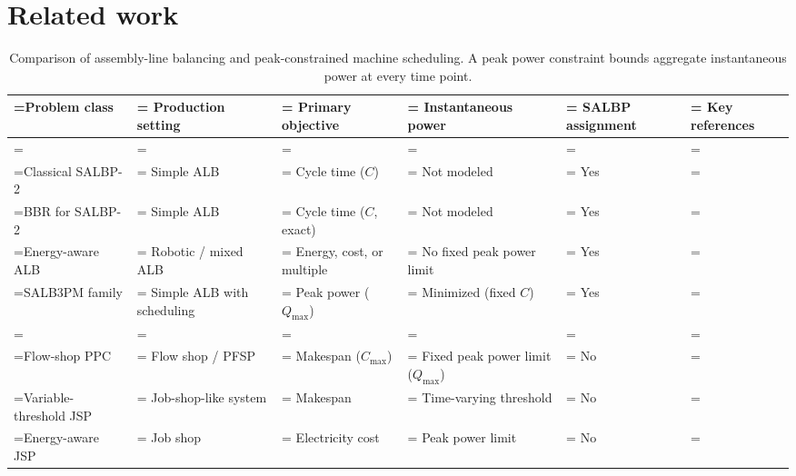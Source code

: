 \documentclass[]{interact}
\theoremstyle{plain}
\theoremstyle{definition}
\theoremstyle{remark}
\begin{document}
\section{Related work}
\label{sec:related-work}

\begin{table}[t!]
\centering
\caption{Comparison of assembly-line balancing and peak-constrained machine scheduling. A peak power constraint bounds aggregate instantaneous power at every time point.}
\label{tab:related-work}
\footnotesize
\renewcommand{\arraystretch}{1.25}
\renewcommand\tabularxcolumn[1]{m{#1}}
\setlength{\tabcolsep}{4pt}
\begin{tabularx}{\textwidth}{@{}
>{\hsize\linewidth=\hsize}Y
>{\hsize\linewidth=\hsize}Y
>{\hsize\linewidth=\hsize}Z
>{\hsize\linewidth=\hsize}Z
>{\hsize\linewidth=\hsize}Z
>{\hsize\linewidth=\hsize}Y
@{}}
\toprule
Problem class & Production setting & Primary objective & Instantaneous power & SALBP assignment & Key references \\
\midrule
{} \\
\addlinespace[2pt]
Classical SALBP-2
& Simple ALB & Cycle time ($C$) & Not modeled & Yes
& \citep{Scholl2006,Li2021Enhanced} \\
BBR for SALBP-2
& Simple ALB & Cycle time ($C$, exact) & Not modeled & Yes
& \citep{Alvarez2024BBR} \\
Energy-aware ALB
& Robotic / mixed ALB & Energy, cost, or multiple & No fixed peak power limit & Yes
& \citep{Zhang2018Modelling,Zhang2020A} \\
SALB3PM family
& Simple ALB with scheduling & Peak power ($Q_{\max}$) & Minimized (fixed $C$) & Yes
& \citep{Gianessi2019Simple,Lamy2020IFAC,Py2024POS,Zheng2024Optimizing,VanKieu2025Compact} \\
\addlinespace[4pt]
 \\
\addlinespace[2pt]
Flow-shop PPC
& Flow shop / PFSP & Makespan ($C_{\max}$) & Fixed peak power limit ($Q_{\max}$) & No
& \citep{Fang2013Flow,Wang2019Decoding,Lv2024Considering} \\
Variable-threshold JSP
& Job-shop-like system & Makespan & Time-varying threshold & No
& \citep{Kemmoe2017Jobshop} \\
Energy-aware JSP
& Job shop & Electricity cost & Peak power limit & No
& \citep{Masmoudi2019Jobshop} \\

\end{tabularx}
\end{table}
\end{document}
